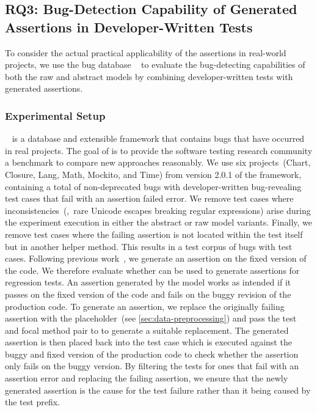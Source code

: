 
\subsection{RQ3: Bug-Detection Capability of Generated Assertions in
Developer-Written Tests}\label{sec:rq-defects4j}

To consider the actual practical applicability of the \assertfive
assertions in real-world projects, we use the bug database
~\cite{Just2014} to evaluate the bug-detecting
capabilities of both the raw and abstract \assertfive models by
combining developer-written tests with generated assertions.


\subsubsection{Experimental Setup}

~\cite{Just2014} is a database and extensible framework
that contains bugs that have occurred in real projects. The goal of
 is to provide the software testing research community a
benchmark to compare new approaches reasonably.
We use six projects~(Chart, Closure, Lang, Math, Mockito, and Time)
from version 2.0.1 of the framework, containing a total of
\dfjTotalBugs non-deprecated bugs with \dfjTotalTests
developer-written bug-revealing test cases that fail with an assertion
failed error.
We remove test cases where inconsistencies~(\eg,~rare Unicode escapes
breaking regular expressions) arise during the experiment execution in
either the abstract or raw model variants.
Finally, we remove \dfjAssertionLocationInHelperTotal test cases where
the failing assertion is not located within the test itself but in
another helper method.
This results in a test corpus of
\dfjAssertionLocationInTestTotalBugs{} bugs with
\dfjAssertionLocationInTestTotalTests{} test cases.
Following previous work~\cite{Dinella2022,Tufano2022}, we generate an
assertion on the fixed version of the code. We therefore evaluate
whether \assertfive can be used to generate assertions for regression
tests.
An assertion generated by the model works as intended if it passes on
the fixed version of the code and fails on the buggy revision of the
production code.
To generate an assertion, we replace the originally failing assertion
with the placeholder~(see \cref{sec:data-preprocessing}) and pass the
test and focal method pair to \assertfive to generate a suitable
replacement.
The generated assertion is then placed back into the test case which
is executed against the buggy and fixed version of the production code
to check whether the assertion only fails on the buggy version.
By filtering the tests for ones that fail with an assertion error and
replacing the failing assertion, we ensure that the newly generated
assertion is the cause for the test failure rather than it being
caused by the test prefix.

